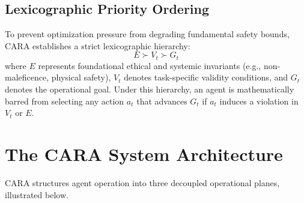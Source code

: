 \documentclass[11pt,a4paper]{article}
\begin{document}
\subsection{Lexicographic Priority Ordering}
To prevent optimization pressure from degrading fundamental safety bounds, CARA establishes a strict lexicographic hierarchy:
\begin{equation}
    E \succ V_t \succ G_t
\end{equation}
where $E$ represents foundational ethical and systemic invariants (e.g., non-maleficence, physical safety), $V_t$ denotes task-specific validity conditions, and $G_t$ denotes the operational goal. Under this hierarchy, an agent is mathematically barred from selecting any action $a_t$ that advances $G_t$ if $a_t$ induces a violation in $V_t$ or $E$.

\section{The CARA System Architecture}

CARA structures agent operation into three decoupled operational planes, illustrated below.
\end{document}
